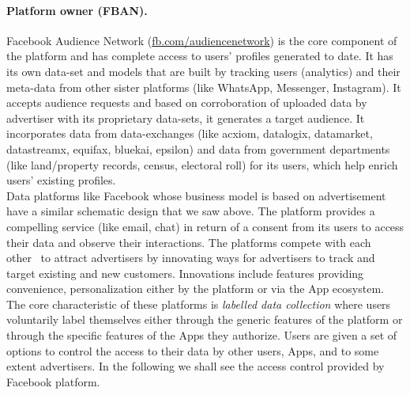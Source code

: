 \documentclass[a4paper,twoside]{article}
\begin{document}
\paragraph{Platform owner (FBAN).}
Facebook Audience Network (\url{fb.com/audiencenetwork}) is the core
component of the platform and has complete access to users' profiles
generated to date. It has its own data-set and models that are built
by tracking users (analytics) and their meta-data from other sister
platforms (like WhatsApp, Messenger, Instagram). It accepts audience
requests and based on corroboration of uploaded data by advertiser
with its proprietary data-sets, it generates a target audience. It
incorporates data from data-exchanges (like acxiom, datalogix, datamarket, datastreamx,
equifax, bluekai, epsilon) and data from government departments (like
land/property records, census, electoral roll) for its users, which
help enrich users' existing profiles.\\

\noindent Data platforms like Facebook whose business model is based
on advertisement have a similar schematic design that we saw
above. The platform provides a compelling service (like email, chat)
in return of a consent from its users to access their data and observe
their interactions. The platforms compete with each
other~\cite{data-goliath} to attract advertisers by innovating ways
for advertisers to track and target existing and new
customers. Innovations include features providing convenience,
personalization either by the platform or via the App ecosystem. The
core characteristic of these platforms is \textit{labelled data
  collection} where users voluntarily label themselves either through
the generic features of the platform or through the specific features
of the Apps they authorize. Users are given a set of options to
control the access to their data by other users, Apps, and to some
extent advertisers. In the following we shall see the access control
provided by Facebook platform.
\end{document}
